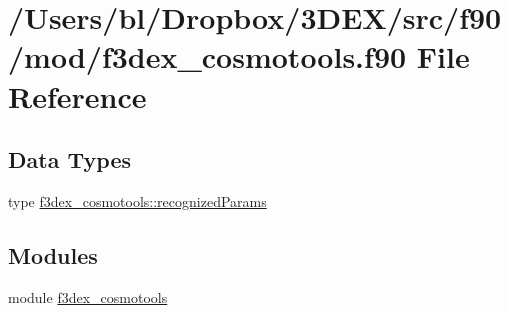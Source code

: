 \hypertarget{f3dex__cosmotools_8f90}{
\section{/Users/bl/Dropbox/3DEX/src/f90/mod/f3dex\_\-cosmotools.f90 File Reference}
\label{f3dex__cosmotools_8f90}
}
\subsection*{Data Types}
\begin{DoxyCompactItemize}
\item 
type \hyperlink{typef3dex__cosmotools_1_1recognized_params}{f3dex\_\-cosmotools::recognizedParams}
\end{DoxyCompactItemize}
\subsection*{Modules}
\begin{DoxyCompactItemize}
\item 
module \hyperlink{namespacef3dex__cosmotools}{f3dex\_\-cosmotools}
\end{DoxyCompactItemize}
